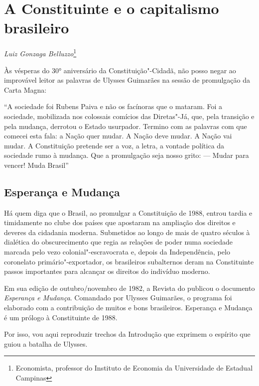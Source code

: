 \chapter*{A Constituinte e o capitalismo brasileiro}


\begin{flushright}
\emph{Luiz Gonzaga Belluzzo}\footnote{Economista, professor do Instituto de Economia da Universidade de Estadual Campinas}
\end{flushright}

Às vésperas do 30° aniversário da Constituição"-Cidadã, não posso negar
ao improvável leitor as palavras de Ulysses Guimarães na sessão de
promulgação da Carta Magna:

``A sociedade foi Rubens Paiva e não os facínoras que o mataram. Foi a
sociedade, mobilizada nos colossais comícios das Diretas"-Já, que, pela
transição e pela mudança, derrotou o Estado usurpador. Termino com as
palavras com que comecei esta fala: a Nação quer mudar. A Nação deve
mudar. A Nação vai mudar. A Constituição pretende ser a voz, a letra, a
vontade política da sociedade rumo à mudança. Que a promulgação seja
nosso grito: --- Mudar para vencer! Muda Brasil''

\section{Esperança e Mudança}

Há quem diga que o Brasil, ao promulgar a Constituição de 1988, entrou
tardia e timidamente no clube dos países que apostaram na ampliação dos
direitos e deveres da cidadania moderna. Submetidos ao longo de mais de
quatro séculos à dialética do obscurecimento que regia as relações de
poder numa sociedade marcada pelo vezo colonial"-escravocrata e, depois
da Independência, pelo coronelato primário"-exportador, os brasileiros
subalternos deram na Constituinte passos importantes para alcançar os
direitos do indivíduo moderno.

Em sua edição de outubro/novembro de 1982, a Revista do  publicou o
documento \emph{Esperança e Mudança}. Comandado por Ulysses Guimarães, o
programa foi elaborado com a contribuição de muitos e bons brasileiros.
Esperança e Mudança é um prólogo à Constituinte de 1988.

Por isso, vou aqui reproduzir trechos da Introdução que exprimem o
espírito que guiou a batalha de Ulysses.

